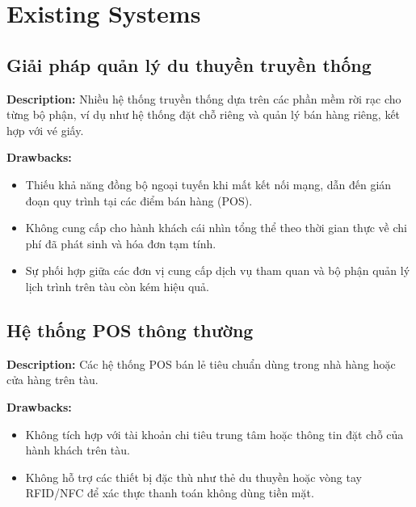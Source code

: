 \section{Existing Systems}
\subsection{Giải pháp quản lý du thuyền truyền thống}
\textbf{Description:} Nhiều hệ thống truyền thống dựa trên các phần mềm rời rạc cho từng bộ phận, ví dụ như hệ thống đặt chỗ riêng và quản lý bán hàng riêng, kết hợp với vé giấy.

\textbf{Drawbacks:}
\begin{itemize}
    \item Thiếu khả năng đồng bộ ngoại tuyến khi mất kết nối mạng, dẫn đến gián đoạn quy trình tại các điểm bán hàng (POS).
    \item Không cung cấp cho hành khách cái nhìn tổng thể theo thời gian thực về chi phí đã phát sinh và hóa đơn tạm tính.
    \item Sự phối hợp giữa các đơn vị cung cấp dịch vụ tham quan và bộ phận quản lý lịch trình trên tàu còn kém hiệu quả.
\end{itemize}

\subsection{Hệ thống POS thông thường}
\textbf{Description:} Các hệ thống POS bán lẻ tiêu chuẩn dùng trong nhà hàng hoặc cửa hàng trên tàu.

\textbf{Drawbacks:}
\begin{itemize}
    \item Không tích hợp với tài khoản chi tiêu trung tâm hoặc thông tin đặt chỗ của hành khách trên tàu.
    \item Không hỗ trợ các thiết bị đặc thù như thẻ du thuyền hoặc vòng tay RFID/NFC để xác thực thanh toán không dùng tiền mặt.
\end{itemize}